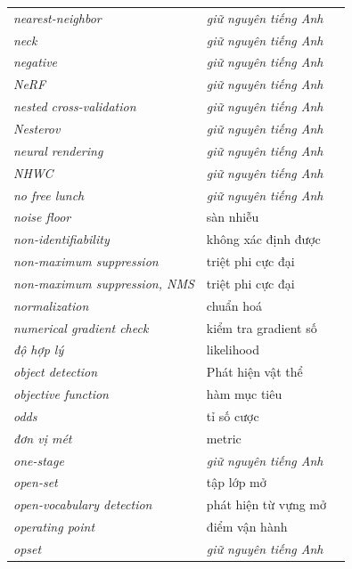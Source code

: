 \documentclass[deep_learning.tex]{subfiles}
\begin{document}
\begin{longtable}{@{}L{5.2cm}L{5.9cm}L{2.6cm}@{}}
\emph{nearest-neighbor} & \emph{\color{tiercol}giữ nguyên tiếng Anh} & \\
\emph{neck} & \emph{\color{tiercol}giữ nguyên tiếng Anh} & \\
\emph{negative} & \emph{\color{tiercol}giữ nguyên tiếng Anh} & \\
\emph{NeRF} & \emph{\color{tiercol}giữ nguyên tiếng Anh} & \\
\emph{nested cross-validation} & \emph{\color{tiercol}giữ nguyên tiếng Anh} & \\
\emph{Nesterov} & \emph{\color{tiercol}giữ nguyên tiếng Anh} & \\
\emph{neural rendering} & \emph{\color{tiercol}giữ nguyên tiếng Anh} & \\
\emph{NHWC} & \emph{\color{tiercol}giữ nguyên tiếng Anh} & \\
\emph{no free lunch} & \emph{\color{tiercol}giữ nguyên tiếng Anh} & \\
\emph{noise floor} & sàn nhiễu & \\
\emph{non-identifiability} & không xác định được & \\
\emph{non-maximum suppression} & triệt phi cực đại & \\
\emph{non-maximum suppression, NMS} & triệt phi cực đại & \\
\emph{normalization} & chuẩn hoá & \\
\emph{numerical gradient check} & kiểm tra gradient số & \\
\emph{độ hợp lý} & likelihood & \\
\emph{object detection} & Phát hiện vật thể & \\
\emph{objective function} & hàm mục tiêu & \\
\emph{odds} & tỉ số cược & \\
\emph{đơn vị mét} & metric & \\
\emph{one-stage} & \emph{\color{tiercol}giữ nguyên tiếng Anh} & \\
\emph{open-set} & tập lớp mở & \\
\emph{open-vocabulary detection} & phát hiện từ vựng mở & \\
\emph{operating point} & điểm vận hành & \\
\emph{opset} & \emph{\color{tiercol}giữ nguyên tiếng Anh} & \\

\end{longtable}
\end{document}
